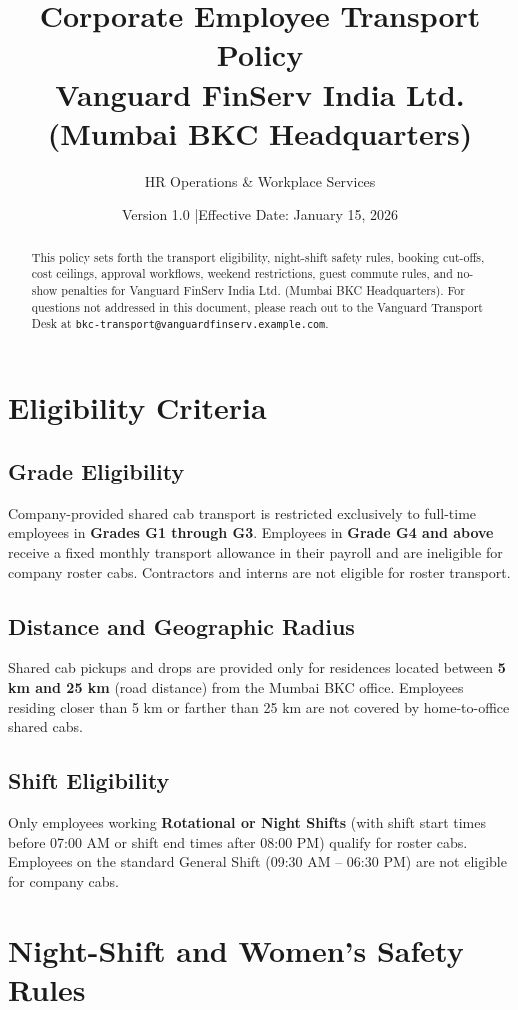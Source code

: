 \documentclass[11pt,a4paper]{article}
\title{\textbf{Corporate Employee Transport Policy}\\[0.4em]
\large Vanguard FinServ India Ltd. (Mumbai BKC Headquarters)}
\author{HR Operations \& Workplace Services}
\date{Version 1.0 \quad|\quad Effective Date: January 15, 2026}
\begin{document}
\maketitle
\thispagestyle{fancy}

\begin{abstract}
This policy sets forth the transport eligibility, night-shift safety rules, booking cut-offs, cost ceilings, approval workflows, weekend restrictions, guest commute rules, and no-show penalties for Vanguard FinServ India Ltd. (Mumbai BKC Headquarters). For questions not addressed in this document, please reach out to the Vanguard Transport Desk at \texttt{bkc-transport@vanguardfinserv.example.com}.
\end{abstract}

\section{Eligibility Criteria}
\subsection{Grade Eligibility}
Company-provided shared cab transport is restricted exclusively to full-time employees in \textbf{Grades G1 through G3}. Employees in \textbf{Grade G4 and above} receive a fixed monthly transport allowance in their payroll and are ineligible for company roster cabs. Contractors and interns are not eligible for roster transport.

\subsection{Distance and Geographic Radius}
Shared cab pickups and drops are provided only for residences located between \textbf{5 km and 25 km} (road distance) from the Mumbai BKC office. Employees residing closer than 5 km or farther than 25 km are not covered by home-to-office shared cabs.

\subsection{Shift Eligibility}
Only employees working \textbf{Rotational or Night Shifts} (with shift start times before 07:00 AM or shift end times after 08:00 PM) qualify for roster cabs. Employees on the standard General Shift (09:30 AM -- 06:30 PM) are not eligible for company cabs.

\section{Night-Shift and Women's Safety Rules}
\end{document}
